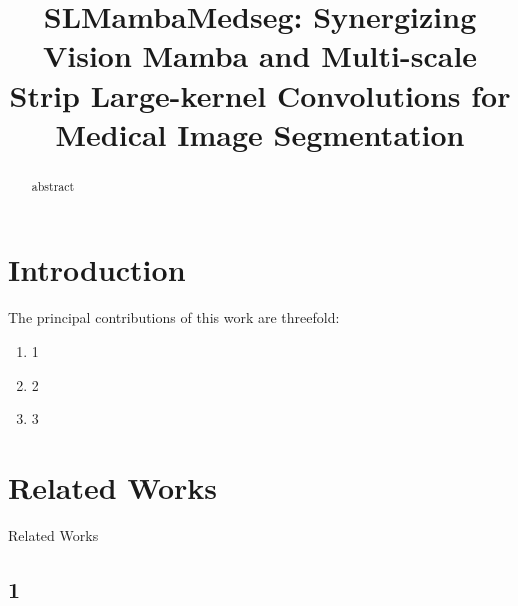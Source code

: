 \documentclass[runningheads]{llncs}
\begin{document}
%
\title{SLMambaMedseg: Synergizing Vision Mamba and Multi-scale Strip Large-kernel Convolutions for Medical Image Segmentation}

%
%
%
%
%
\maketitle              %
%




\begin{abstract}

abstract


\end{abstract}



\section{Introduction}



The principal contributions of this work are threefold: 
\begin{enumerate}
\item 1
\item 2
\item 3
\end{enumerate}


\section{Related Works}

Related Works

\subsection{1}
\end{document}

